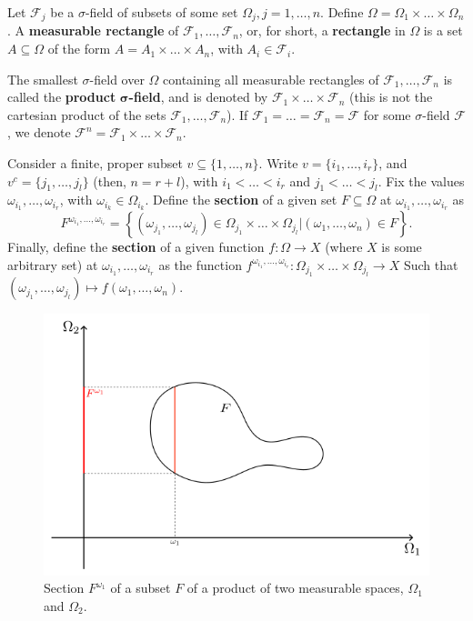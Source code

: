 \begin{defn}
  Let \(\mathcal{F}_{j}\) be a \(\sigma\)-field of subsets of some set \(\Omega_{j}, j=1,\dotsc,n\). Define \(\Omega=\Omega_{1}\times\dotsc\times\Omega_{n}\). A \textbf{measurable rectangle} of \(\mathcal{F}_{1},\dotsc,\mathcal{F}_{n}\), or, for short, a \textbf{rectangle} in \(\Omega\) is a set \(A\subseteq\Omega\) of the form \(A=A_{1}\times\dotsc\times A_{n}\), with \(A_{i}\in\mathcal{F}_{i}\).

  The smallest \(\sigma\)-field over \(\Omega\) containing all measurable rectangles of \(\mathcal{F}_{1},\dotsc,\mathcal{F}_{n}\) is called the \textbf{product} \(\pmb{\sigma}\)\textbf{-field}, and is denoted by \(\mathcal{F}_{1}\times\dotsc\times\mathcal{F}_{n}\) (this is not the cartesian product of the sets \(\mathcal{F}_{1},\dots,\mathcal{F}_{n}\)). If \(\mathcal{F}_1=\dotsc=\mathcal{F}_n=\mathcal{F}\) for some \(\sigma\)-field \(\mathcal{F}\), we denote \(\mathcal{F}^n=\mathcal{F}_1\times\dots\times\mathcal{F}_n\).

  Consider a finite, proper subset \(v\subseteq \{1,\dots,n\}\). Write \(v= \{i_1,\dots,i_r\}\), and
  \(v^c=\{j_1,\dots,j_l\}\) (then, \(n=r+l\)), with \(i_1<\dots<i_r\) and \(j_1<\dots<j_l\). Fix the values
  \(\omega_{i_1},\dots,\omega_{i_r}\), with \(\omega_{i_k}\in\Omega_{i_k}\).
  Define the \textbf{section} of a given set \(F\subseteq\Omega\) at \(\omega_{i_1},\dots,\omega_{i_r}\) as
  \[F^{\omega_{i_1},\dots,\omega_{i_r}}=\left\{\left(\omega_{j_1},\dots,\omega_{j_l}\right)\in\Omega_{j_1}\times \dots\times \Omega_{j_l}\left|\left(\omega_1,\dotsc,\omega_n\right)\in F\right.\right\}.\]
  Finally, define the \textbf{section} of a given function \(f\colon \Omega\to X \) (where \(X\) is some arbitrary set) at \(\omega_{i_{1}}, \dots , \omega_{i_{r}}\) as the function \(f^{\omega_{i_{1}}, \dots , \omega_{i_{r}}}\colon\Omega_{j_{1}}\times \dots \times \Omega_{j_{l}}\to X\) Such that \((\omega_{j_{1}}, \dots , \omega_{j_{l}})\mapsto f(\omega_1,\dots,\omega_n)\).
\end{defn}

\begin{figure}[!h]
    \centering
    \includegraphics[width=0.9\linewidth]{resources/figures/section.png}
    \caption{Section \(F^{\omega_1}\) of a subset \(F\) of a product of two measurable spaces, \(\Omega_1\) and \(\Omega_2\).}
    \label{figure:section}
\end{figure}

